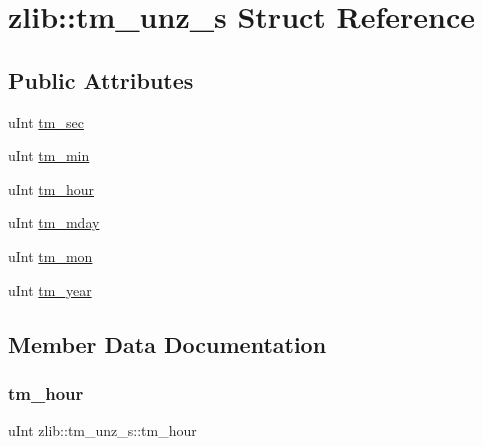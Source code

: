 \hypertarget{structzlib_1_1tm__unz__s}{}\section{zlib\+:\+:tm\+\_\+unz\+\_\+s Struct Reference}
\label{structzlib_1_1tm__unz__s}
\subsection*{Public Attributes}
\begin{DoxyCompactItemize}
\item 
u\+Int \hyperlink{structzlib_1_1tm__unz__s_af9b94815676a8e818a2dbe15ec483997}{tm\+\_\+sec}
\item 
u\+Int \hyperlink{structzlib_1_1tm__unz__s_a9db8fc1d85d88f474a6ac9081902f4ff}{tm\+\_\+min}
\item 
u\+Int \hyperlink{structzlib_1_1tm__unz__s_ad84fae7e7a17f7de3fc92fd042a47475}{tm\+\_\+hour}
\item 
u\+Int \hyperlink{structzlib_1_1tm__unz__s_a2c7bd418723584771643d589cecc1f4c}{tm\+\_\+mday}
\item 
u\+Int \hyperlink{structzlib_1_1tm__unz__s_afaf179c646fcb0de6df304874ab560ef}{tm\+\_\+mon}
\item 
u\+Int \hyperlink{structzlib_1_1tm__unz__s_aca4c404f1da147a0a27b6c9ad2c6f6fe}{tm\+\_\+year}
\end{DoxyCompactItemize}


\subsection{Member Data Documentation}
\mbox{\label{structzlib_1_1tm__unz__s_ad84fae7e7a17f7de3fc92fd042a47475}} 
\subsubsection{\texorpdfstring{tm\+\_\+hour}{tm\_hour}}
{\footnotesize\ttfamily u\+Int zlib\+::tm\+\_\+unz\+\_\+s\+::tm\+\_\+hour}

\mbox{\label{structzlib_1_1tm__unz__s_a2c7bd418723584771643d589cecc1f4c}} 
